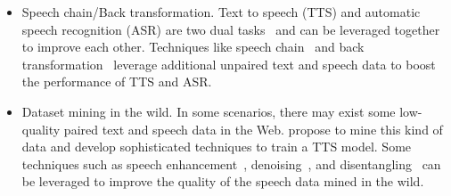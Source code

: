 \documentclass{article}
\begin{document}
\begin{itemize}[leftmargin=*]
    \item Speech chain/Back transformation. Text to speech (TTS) and automatic speech recognition (ASR) are two dual tasks~\cite{qin2020dual} and can be leveraged together to improve each other. Techniques like speech chain~\cite{tjandra2017listening,tjandra2018machine} and back transformation~\cite{ren2019almost,xu2020lrspeech} leverage additional unpaired text and speech data to boost the performance of TTS and ASR.
    \item Dataset mining in the wild. In some scenarios, there may exist some low-quality paired text and speech data in the Web. \citet{cooper2019text,hu2019neural} propose to mine this kind of data and develop sophisticated techniques to train a TTS model. Some techniques such as speech enhancement~\cite{valentini2018speech}, denoising~\cite{zhang2020denoising}, and disentangling~\cite{wang2018style,hsu2019disentangling} can be leveraged to improve the quality of the speech data mined in the wild.
\end{itemize}
\end{document}

